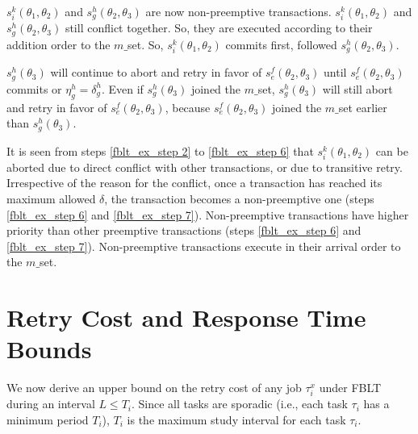 \documentclass[a4paper,english]{article}
\begin{document}
\begin{compactenum}
%
\item $s_{i}^{k}(\theta_{1},\theta_{2})$ and $s_{g}^{h}(\theta_{2},\theta_{3})$
are now non-preemptive transactions. $s_{i}^{k}(\theta_{1},\theta_{2})$
and $s_{g}^{h}(\theta_{2},\theta_{3})$ still conflict together. So,
they are executed according to their addition order to the $m\_$set.
So, $s_{i}^{k}(\theta_{1},\theta_{2})$ commits first, followed $s_{g}^{h}(\theta_{2},\theta_{3})$.
\item $s_{g}^{h}(\theta_{3})$ will continue to abort and retry in favor
of $s_{e}^{f}(\theta_{2},\theta_{3})$ until $s_{e}^{f}(\theta_{2},\theta_{3})$
commits or $\eta_{g}^{h}=\delta_{g}^{h}$. Even if $s_{g}^{h}(\theta_{3})$
joined the $m\_$set, $s_{g}^{h}(\theta_{3})$ will still abort and retry
in favor of $s_{e}^{f}(\theta_{2},\theta_{3})$, because $s_{e}^{f}(\theta_{2},\theta_{3})$ joined the $m\_$set earlier than $s_{g}^{h}(\theta_{3})$.
\end{compactenum}

It is seen from steps \ref{fblt_ex_step 2} to \ref{fblt_ex_step 6}
that $s_{i}^{k}(\theta_{1},\theta_{2})$ can be aborted due to direct
conflict with other transactions, or due to transitive retry. Irrespective of 
the reason for the conflict, once a transaction has reached its maximum
allowed $\delta$, the transaction becomes a non-preemptive one
(steps \ref{fblt_ex_step 6} and \ref{fblt_ex_step 7}). Non-preemptive
transactions have higher priority than other preemptive transactions
(steps \ref{fblt_ex_step 6} and \ref{fblt_ex_step 7}). Non-preemptive
transactions execute in their arrival order to the $m\_$set.


\section{Retry Cost and Response Time Bounds}\label{fblt rc}

We now derive an upper bound on the retry cost of any job $\tau_{i}^{x}$
under FBLT during an interval $L\le T_{i}$. Since all tasks are sporadic
(i.e., each task $\tau_{i}$ has a minimum period $T_{i}$), $T_{i}$
is the maximum study interval for each task $\tau_{i}$.
\end{document}
